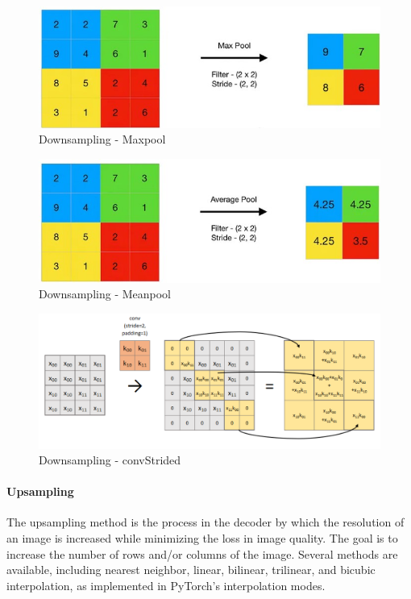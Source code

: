 \documentclass[twocolumn]{article}
\begin{document}
\begin{figure}
    \centering
    \includegraphics[width=1\linewidth]{Maxpool.jpg}
    \caption{Downsampling - Maxpool}
    \label{fig:maxpool}
\end{figure}

\begin{figure}
    \centering
    \includegraphics[width=1\linewidth]{Meanpool.jpg}
    \caption{Downsampling - Meanpool}
    \label{fig:meanpool}
\end{figure}

\begin{figure}
    \centering
    \includegraphics[width=1\linewidth]{ConvStrided_new.png}
    \caption{Downsampling - convStrided}
    \label{fig:convStrided}
\end{figure}


\paragraph{Upsampling}
The upsampling method is the process in the decoder by which the resolution of an image is increased while minimizing the loss in image quality. 
The goal is to increase the number of rows and/or columns of the image. 
Several methods are available, including nearest neighbor, linear, bilinear, trilinear, and bicubic interpolation, as implemented in PyTorch's interpolation modes.
\end{document}
